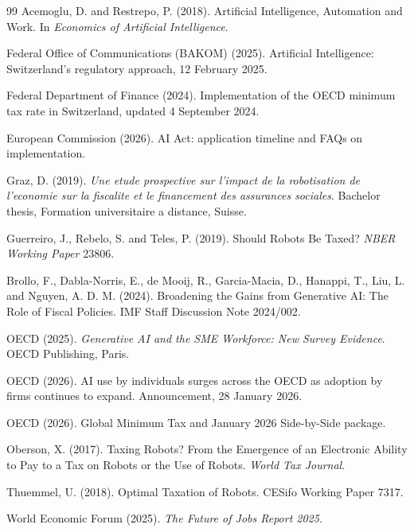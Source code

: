 \documentclass[11pt]{article}
\begin{document}

\begin{thebibliography}{99}
Acemoglu, D. and Restrepo, P. (2018).
\newblock Artificial Intelligence, Automation and Work.
\newblock In \textit{Economics of Artificial Intelligence}.

Federal Office of Communications (BAKOM) (2025).
\newblock Artificial Intelligence: Switzerland's regulatory approach, 12 February 2025.

Federal Department of Finance (2024).
\newblock Implementation of the OECD minimum tax rate in Switzerland, updated 4 September 2024.

European Commission (2026).
\newblock AI Act: application timeline and FAQs on implementation.

Graz, D. (2019).
\newblock \textit{Une etude prospective sur l'impact de la robotisation de l'economie sur la fiscalite et le financement des assurances sociales}.
\newblock Bachelor thesis, Formation universitaire a distance, Suisse.

Guerreiro, J., Rebelo, S. and Teles, P. (2019).
\newblock Should Robots Be Taxed?
\newblock \textit{NBER Working Paper} 23806.

Brollo, F., Dabla-Norris, E., de Mooij, R., Garcia-Macia, D., Hanappi, T., Liu, L. and Nguyen, A. D. M. (2024).
\newblock Broadening the Gains from Generative AI: The Role of Fiscal Policies.
\newblock IMF Staff Discussion Note 2024/002.

OECD (2025).
\newblock \textit{Generative AI and the SME Workforce: New Survey Evidence}.
\newblock OECD Publishing, Paris.

OECD (2026).
\newblock AI use by individuals surges across the OECD as adoption by firms continues to expand.
\newblock Announcement, 28 January 2026.

OECD (2026).
\newblock Global Minimum Tax and January 2026 Side-by-Side package.

Oberson, X. (2017).
\newblock Taxing Robots? From the Emergence of an Electronic Ability to Pay to a Tax on Robots or the Use of Robots.
\newblock \textit{World Tax Journal}.

Thuemmel, U. (2018).
\newblock Optimal Taxation of Robots.
\newblock CESifo Working Paper 7317.

World Economic Forum (2025).
\newblock \textit{The Future of Jobs Report 2025}.

\end{thebibliography}
\end{document}
